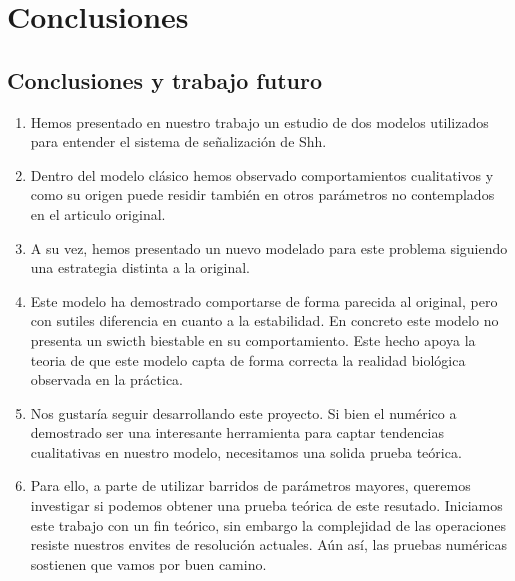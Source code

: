 
\chapter{Conclusiones}

\label{ch:conclusions}

\section{Conclusiones y trabajo futuro}
\begin{enumerate}
	\item Hemos presentado en nuestro trabajo un estudio de dos modelos utilizados para entender el sistema de señalización de Shh. 
	\item  Dentro del modelo clásico hemos observado comportamientos cualitativos y como su origen puede residir también en otros parámetros no contemplados en el articulo original.
	\item  A su vez, hemos presentado un nuevo modelado para este problema siguiendo una estrategia distinta a la original.
	\item Este modelo ha demostrado comportarse de forma parecida al original, pero con sutiles diferencia en cuanto a la estabilidad. En concreto este modelo no presenta un swicth biestable en su comportamiento. Este hecho apoya la teoria de que este modelo capta de forma correcta la realidad biológica observada en la práctica.
	\item Nos gustaría seguir desarrollando este proyecto. Si bien el numérico a demostrado ser una interesante herramienta para captar tendencias cualitativas en nuestro modelo, necesitamos una solida prueba teórica.
	\item Para ello, a parte de utilizar barridos de parámetros mayores, queremos investigar si podemos obtener una prueba teórica de este resutado. Iniciamos este trabajo con un fin teórico, sin embargo la complejidad de las operaciones resiste nuestros envites de resolución actuales. Aún así, las pruebas numéricas sostienen que vamos por buen camino.
\end{enumerate}



 

 
 
 